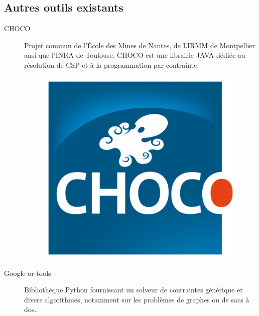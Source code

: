 \subsection{Autres outils existants}
\begin{description}
\item [CHOCO]  Projet commun  de l'École des Mines de Nantes, de \textsc{LIRMM} de Montpellier ansi que l'\textsc{INRA} de Toulouse. \textsc{CHOCO} est une librairie  \textsc{JAVA}  dédiée au résolution de \textsc{CSP} et à la programmation par contrainte\cite{choco}.
 \begin{figure}[h] %
  \center
\includegraphics[scale=0.50]{img/choco}
\end{figure} %
\item [Google or-tools]
 Bibliothèque Python fournissant un solveur de contraintes générique et divers algorithmes, notamment sur les problèmes de graphes ou de sacs à dos\cite{ortools}.


\end{description}
